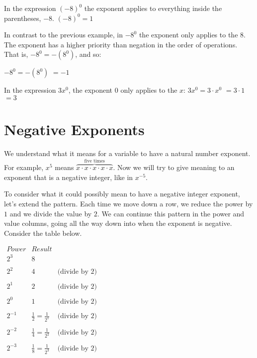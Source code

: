 \documentclass{ximera}
\begin{document}
       In the expression $(-8)^0$ the exponent applies to everything inside the parentheses,
                    $-8$.
                    $
                      (-8)^0  =  1
                    $

       In contrast to the previous example, in $-8^0$
                    the exponent only applies to the $8$.
                    The exponent has a higher priority than negation in the order of operations.
                   That is, $-8^0 = -\left(8^0\right)$, and so:
                   
                      $-8^0  =  -\left(8^0\right)$
                      $=  -1$

      In the expression $3x^0$,
                    the exponent $0$ only applies to the $x$:
                      $3x^0 = 3\cdot x^0$
                      $= 3\cdot 1$
                      $= 3$
\section{Negative Exponents}
   We understand what it means for a variable to have a natural number exponent.
      For example, $x^5$ means $\overbrace{x\cdot x\cdot x\cdot x\cdot x}^{\text{five times}}$.
      Now we will try to give meaning to an exponent that is a negative integer,
      like in $x^{-5}$.

        To consider what it could possibly mean to have a negative integer exponent,
        let's extend the pattern.  Each time we move down a row,
        we reduce the power by $1$ and we divide the value by $2$.
        We can continue this pattern in the power and value columns,
        going all the way down into when the exponent is negative.  Consider the table below.
\begin{center}
$
  \begin{array}{ccc}
            Power & Result & \\
        \hline
            2^3 & 8 & \\
\\
              2^2 & 4 & \text{(divide by 2)} \\
\\
               2^1 & 2 & \text{(divide by 2)} \\
\\
                     2^0 & 1 & \text{(divide by 2)} \\
\\
           2^{-1} & \frac{1}{2}=\frac{1}{2^1} & \text{(divide by 2)} \\   
\\       
           2^{-2} & \frac{1}{4}=\frac{1}{2^2} & \text{(divide by 2)} \\
\\
                   2^{-3} & \frac{1}{8}=\frac{1}{2^3} & \text{(divide by 2)} \\          
     \end{array}
$
\end{center}
\end{document}

